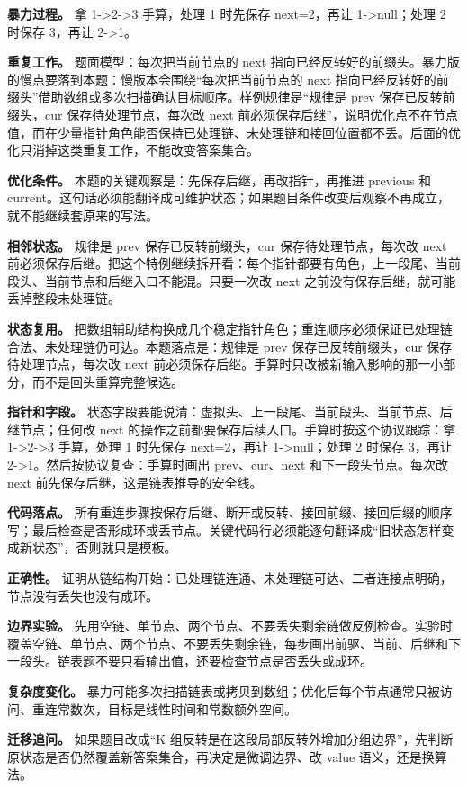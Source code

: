 \textbf{暴力过程。} 拿 1->2->3 手算，处理 1 时先保存 next=2，再让 1->null；处理 2 时保存 3，再让 2->1。

\textbf{重复工作。} 题面模型：每次把当前节点的 next 指向已经反转好的前缀头。暴力版的慢点要落到本题：慢版本会围绕“每次把当前节点的 next 指向已经反转好的前缀头”借助数组或多次扫描确认目标顺序。样例规律是“规律是 prev 保存已反转前缀头，cur 保存待处理节点，每次改 next 前必须保存后继”，说明优化点不在节点值，而在少量指针角色能否保持已处理链、未处理链和接回位置都不丢。后面的优化只消掉这类重复工作，不能改变答案集合。

\textbf{优化条件。} 本题的关键观察是：先保存后继，再改指针，再推进 previous 和 current。这句话必须能翻译成可维护状态；如果题目条件改变后观察不再成立，就不能继续套原来的写法。

\textbf{相邻状态。} 规律是 prev 保存已反转前缀头，cur 保存待处理节点，每次改 next 前必须保存后继。把这个特例继续拆开看：每个指针都要有角色，上一段尾、当前段头、当前节点和后继入口不能混。只要一次改 next 之前没有保存后继，就可能丢掉整段未处理链。

\textbf{状态复用。} 把数组辅助结构换成几个稳定指针角色；重连顺序必须保证已处理链合法、未处理链仍可达。本题落点是：规律是 prev 保存已反转前缀头，cur 保存待处理节点，每次改 next 前必须保存后继。手算时只改被新输入影响的那一小部分，而不是回头重算完整候选。

\textbf{指针和字段。} 状态字段要能说清：虚拟头、上一段尾、当前段头、当前节点、后继节点；任何改 next 的操作之前都要保存后续入口。手算时按这个协议跟踪：拿 1->2->3 手算，处理 1 时先保存 next=2，再让 1->null；处理 2 时保存 3，再让 2->1。然后按协议复查：手算时画出 prev、cur、next 和下一段头节点。每次改 next 前先保存后继，这是链表推导的安全线。

\textbf{代码落点。} 所有重连步骤按保存后继、断开或反转、接回前缀、接回后缀的顺序写；最后检查是否形成环或丢节点。关键代码行必须能逐句翻译成“旧状态怎样变成新状态”，否则就只是模板。

\textbf{正确性。} 证明从链结构开始：已处理链连通、未处理链可达、二者连接点明确，节点没有丢失也没有成环。

\textbf{边界实验。} 先用空链、单节点、两个节点、不要丢失剩余链做反例检查。实验时覆盖空链、单节点、两个节点、不要丢失剩余链，每步画出前驱、当前、后继和下一段头。链表题不要只看输出值，还要检查节点是否丢失或成环。

\textbf{复杂度变化。} 暴力可能多次扫描链表或拷贝到数组；优化后每个节点通常只被访问、重连常数次，目标是线性时间和常数额外空间。

\textbf{迁移追问。} 如果题目改成“K 组反转是在这段局部反转外增加分组边界”，先判断原状态是否仍然覆盖新答案集合，再决定是微调边界、改 value 语义，还是换算法。

